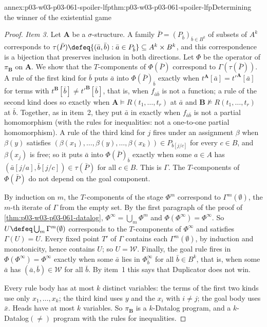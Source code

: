 \begin{annexitem}{annex:p03-w03-p03-061-spoiler-lfp}{thm:p03-w03-p03-061-spoiler-lfp}{Determining the winner of the existential game}
\begin{proof}
\emph{Item 3.} Let \(\mathbf A\) be a \(\sigma\)-structure. A family
\(\bar P=(P_{\bar b})_{\bar b\in B^k}\) of subsets of \(A^k\) corresponds to
\(\tau(\bar P)\defeq\{(\bar a,\bar b):\bar a\in P_{\bar b}\}\subseteq
A^k\times B^k\), and this correspondence is a bijection that preserves
inclusion in both directions. Let \(\Phi\) be the operator of
\(\pi_{\mathbf B}\) on \(\mathbf A\). We show that the \(T\)-components of
\(\Phi(\bar P)\) correspond to \(\Gamma(\tau(\bar P))\). A rule of the first
kind for \(\bar b\) puts \(\bar a\) into \(\Phi(\bar P)_{\bar b}\) exactly
when \(t^{\mathbf A}[\bar a]=t'^{\mathbf A}[\bar a]\) for terms with
\(t^{\mathbf B}[\bar b]\neq t'^{\mathbf B}[\bar b]\), that is, when
\(f_{\bar a\bar b}\) is not a function; a rule of the second kind does so
exactly when \(\mathbf A\models R(t_1,\ldots,t_r)\) at \(\bar a\) and
\(\mathbf B\not\models R(t_1,\ldots,t_r)\) at \(\bar b\). Together, as in item~2,
they put \(\bar a\) in exactly when \(f_{\bar a\bar b}\) is not a partial
homomorphism (with the rules for inequalities: not a one-to-one partial
homomorphism). A rule of the third kind for \(j\) fires under an assignment
\(\beta\) when \(\beta(y)\) satisfies
\((\beta(x_1),\ldots,\beta(y),\ldots,\beta(x_k))\in P_{\bar b[j/c]}\) for
every \(c\in B\), and \(\beta(x_j)\) is free; so it puts \(\bar a\) into
\(\Phi(\bar P)_{\bar b}\) exactly when some \(a\in A\) has
\((\bar a[j/a],\bar b[j/c])\in\tau(\bar P)\) for all \(c\in B\). This is
\(\Gamma\). The \(T\)-components of \(\Phi(\bar P)\) do not depend on the
goal component.

By induction on \(m\), the \(T\)-components of the stage \(\Phi^m\)
correspond to \(\Gamma^m(\emptyset)\), the \(m\)-th iterate of \(\Gamma\) from
the empty set. By the first paragraph of the proof of
\cref{thm:p03-w03-p03-061-datalog}, \(\Phi^\infty=\bigcup_m\Phi^m\) and
\(\Phi(\Phi^\infty)=\Phi^\infty\). So \(U\defeq\bigcup_m\Gamma^m(\emptyset)\)
corresponds to the \(T\)-components of \(\Phi^\infty\) and satisfies
\(\Gamma(U)=U\). Every fixed point \(T'\) of \(\Gamma\) contains each
\(\Gamma^m(\emptyset)\), by induction and monotonicity, hence contains \(U\);
so \(U=\mathcal W\). Finally, the goal rule fires in \(\Phi(\Phi^\infty)=
\Phi^\infty\) exactly when some \(\bar a\) lies in \(\Phi^\infty_{\bar b}\)
for all \(\bar b\in B^k\), that is, when some \(\bar a\) has \((\bar a,\bar
b)\in\mathcal W\) for all \(\bar b\). By item~1 this says that Duplicator does
not win.

Every rule body has at most \(k\) distinct variables: the terms of the first
two kinds use only \(x_1,\ldots,x_k\); the third kind uses \(y\) and the
\(x_i\) with \(i\neq j\); the goal body uses \(\bar x\). Heads have at most
\(k\) variables. So \(\pi_{\mathbf B}\) is a \(k\)-Datalog program, and a
\(k\)-Datalog\((\neq)\) program with the rules for inequalities.
\end{proof}
\end{annexitem}

